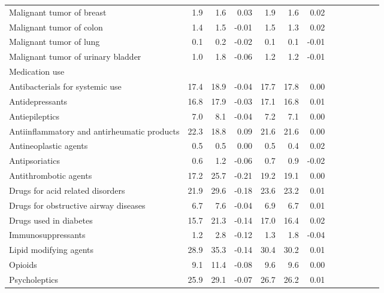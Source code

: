 \documentclass[11pt,]{article}
\begin{document}
\begin{longtable}{lrrrrrrrrrrrr}
      Malignant tumor of breast &  1.9 &  1.6 &  0.03 &  1.9 &  1.6 &  0.02 \\ 
      Malignant tumor of colon &  1.4 &  1.5 & -0.01 &  1.5 &  1.3 &  0.02 \\ 
      Malignant tumor of lung &  0.1 &  0.2 & -0.02 &  0.1 &  0.1 & -0.01 \\ 
      Malignant tumor of urinary bladder &  1.0 &  1.8 & -0.06 &  1.2 &  1.2 & -0.01 \\ 
  Medication use &    &    &     &    &    &     \\ 
      Antibacterials for systemic use & 17.4 & 18.9 & -0.04 & 17.7 & 17.8 &  0.00 \\ 
      Antidepressants & 16.8 & 17.9 & -0.03 & 17.1 & 16.8 &  0.01 \\ 
      Antiepileptics &  7.0 &  8.1 & -0.04 &  7.2 &  7.1 &  0.00 \\ 
      Antiinflammatory and antirheumatic products & 22.3 & 18.8 &  0.09 & 21.6 & 21.6 &  0.00 \\ 
      Antineoplastic agents &  0.5 &  0.5 &  0.00 &  0.5 &  0.4 &  0.02 \\ 
      Antipsoriatics &  0.6 &  1.2 & -0.06 &  0.7 &  0.9 & -0.02 \\ 
      Antithrombotic agents & 17.2 & 25.7 & -0.21 & 19.2 & 19.1 &  0.00 \\ 
      Drugs for acid related disorders & 21.9 & 29.6 & -0.18 & 23.6 & 23.2 &  0.01 \\ 
      Drugs for obstructive airway diseases &  6.7 &  7.6 & -0.04 &  6.9 &  6.7 &  0.01 \\ 
      Drugs used in diabetes & 15.7 & 21.3 & -0.14 & 17.0 & 16.4 &  0.02 \\ 
      Immunosuppressants &  1.2 &  2.8 & -0.12 &  1.3 &  1.8 & -0.04 \\ 
      Lipid modifying agents & 28.9 & 35.3 & -0.14 & 30.4 & 30.2 &  0.01 \\ 
      Opioids &  9.1 & 11.4 & -0.08 &  9.6 &  9.6 &  0.00 \\ 
      Psycholeptics & 25.9 & 29.1 & -0.07 & 26.7 & 26.2 &  0.01 \\ 
   \bottomrule\end{longtable}
\clearpage
{}
\end{document}

